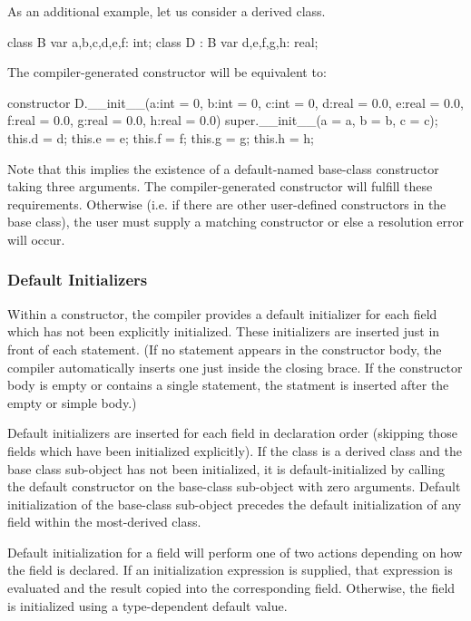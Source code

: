 \begin{example}
As an additional example, let us consider a derived class.
\begin{chapel}
class B {
  var a,b,c,d,e,f: int;
}
class D : B {
  var d,e,f,g,h: real;
}
\end{chapel}
The compiler-generated constructor will be equivalent to:
\begin{chapel}
constructor D.__init__(a:int = 0, b:int = 0, c:int = 0, 
                       d:real = 0.0, e:real = 0.0, f:real = 0.0, 
                       g:real = 0.0, h:real = 0.0)
{ super.__init__(a = a, b = b, c = c);
  this.d = d; this.e = e; this.f = f; this.g = g; this.h = h; }
\end{chapel}
Note that this implies the existence of a default-named base-class constructor
taking three arguments.  The compiler-generated constructor will fulfill these
requirements.  Otherwise (i.e. if there are other user-defined constructors
in the base class), the user must supply a matching constructor or else a resolution
error will occur.
\end{example}

\subsubsection{Default Initializers}
\label{Default_Initializers}

Within a constructor, the compiler provides a default initializer for each field
which has not been explicitly initialized.  These initializers are inserted just
in front of each  statement.  (If no  statement appears in
the constructor body, the compiler automatically inserts one just inside the
closing brace.  If the constructor body is empty or contains a single statement,
the  statment is inserted after the empty or simple body.)

Default initializers are inserted for each field in declaration order (skipping
those fields which have been initialized explicitly).  If the class is a derived
class and the base class sub-object has not been initialized, it is
default-initialized by calling the default constructor on the base-class
sub-object with zero arguments.  Default initialization of the base-class
sub-object precedes the default initialization of any field within the
most-derived class.

Default initialization for a field will perform one of two actions depending on how the
field is declared.  If an initialization expression is supplied, that
expression is evaluated and the result copied into the corresponding field.
Otherwise, the field is initialized using a type-dependent default
value.

